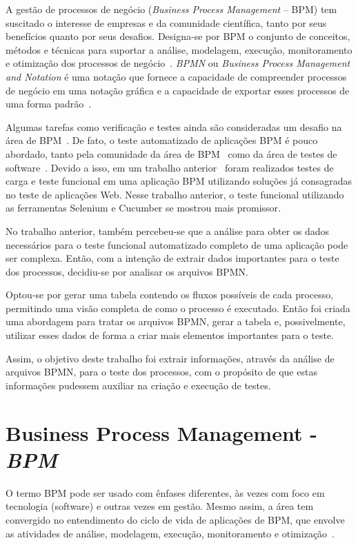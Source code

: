 \documentclass[12pt]{article}
\begin{document}
A gestão de processos de negócio (\emph{Business Process Management} -- BPM) tem suscitado o interesse de empresas e da comunidade científica, tanto por seus benefícios quanto por seus desafios. Designa-se por BPM o conjunto de conceitos, métodos e técnicas para suportar a análise, modelagem, execução, monitoramento e otimização dos processos de negócio~\cite{weske}. \emph{BPMN} ou \emph{Business Process Management and Notation} é uma notação que fornece a capacidade de compreender processos de negócio em uma notação gráfica e a capacidade de exportar esses processos de uma forma padrão~\cite{bpmn}.

Algumas tarefas como verificação e testes ainda são consideradas um desafio na área de BPM~\cite{aalst2013survey}. De fato, o teste automatizado de aplicações BPM é pouco abordado, tanto pela comunidade da área de BPM~\cite{weske} como da área de testes de software~\cite{graham2012experiences}. Devido a isso, em um trabalho anterior~\cite{sbqs2015} foram realizados testes de carga e teste funcional em uma aplicação BPM utilizando soluções já consagradas no teste de aplicações Web. Nesse trabalho anterior, o teste funcional utilizando as ferramentas Selenium e Cucumber se mostrou mais promissor.

No trabalho anterior, também percebeu-se que a análise para obter os dados necessários para o teste funcional automatizado completo de uma aplicação pode ser complexa. Então, com a intenção de extrair dados importantes para o teste dos processos, decidiu-se por analisar os arquivos BPMN. 

Optou-se por gerar uma tabela contendo os fluxos possíveis de cada processo, permitindo uma visão completa de como o processo é executado. Então foi criada uma abordagem para tratar os arquivos BPMN, gerar a tabela e, possivelmente, utilizar esses dados de forma a criar mais elementos importantes para o teste.

Assim, o objetivo deste trabalho foi extrair informações, através da análise de arquivos BPMN, para o teste dos processos, com o propósito de que estas informações pudessem auxiliar na criação e execução de testes. 

\section{Business Process Management - \emph{BPM}}

O termo BPM pode ser usado com ênfases diferentes, às vezes com foco em tecnologia (software) e outras vezes em gestão. Mesmo assim, a área tem convergido no entendimento do ciclo de vida de aplicações de BPM, que envolve as atividades de análise, modelagem, execução, monitoramento e otimização~\cite{ABPMP}. 
\end{document}
